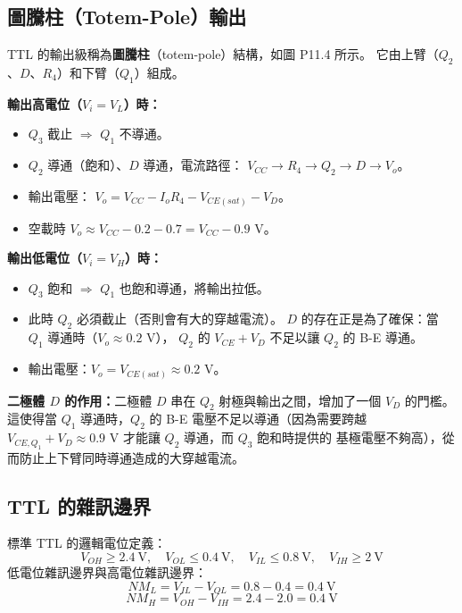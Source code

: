 \documentclass[12pt]{article}
\begin{document}
\subsection*{圖騰柱（Totem-Pole）輸出}

\begin{minipage}{0.58\linewidth}
TTL 的輸出級稱為\textbf{圖騰柱}（totem-pole）結構，如圖 P11.4 所示。
它由上臂（$Q_2$、$D$、$R_4$）和下臂（$Q_1$）組成。

\textbf{輸出高電位（$V_i = V_L$）時：}
\begin{itemize}[leftmargin=1.8em,itemsep=1pt]
\item $Q_3$ 截止 $\Rightarrow$ $Q_1$ 不導通。
\item $Q_2$ 導通（飽和）、$D$ 導通，電流路徑：
  $V_{CC} \to R_4 \to Q_2 \to D \to V_o$。
\item 輸出電壓：
  $V_o = V_{CC} - I_o R_4 - V_{CE(sat)} - V_D$。
\item 空載時 $V_o \approx V_{CC} - 0.2 - 0.7 = V_{CC} - 0.9$ V。
\end{itemize}
\end{minipage}\hfill
\begin{minipage}{0.39\linewidth}
\end{minipage}

\medskip
\textbf{輸出低電位（$V_i = V_H$）時：}
\begin{itemize}[leftmargin=1.8em,itemsep=1pt]
\item $Q_3$ 飽和 $\Rightarrow$ $Q_1$ 也飽和導通，將輸出拉低。
\item 此時 $Q_2$ 必須截止（否則會有大的穿越電流）。
  $D$ 的存在正是為了確保：當 $Q_1$ 導通時（$V_o \approx 0.2$ V），
  $Q_2$ 的 $V_{CE} + V_D$ 不足以讓 $Q_2$ 的 B-E 導通。
\item 輸出電壓：$V_o = V_{CE(sat)} \approx 0.2$ V。
\end{itemize}

\textbf{二極體 $D$ 的作用：}二極體 $D$ 串在 $Q_2$ 射極與輸出之間，增加了一個 $V_D$
的門檻。這使得當 $Q_1$ 導通時，$Q_2$ 的 B-E 電壓不足以導通（因為需要跨越
$V_{CE,Q_1} + V_D \approx 0.9$ V 才能讓 $Q_2$ 導通，而 $Q_3$ 飽和時提供的
基極電壓不夠高），從而防止上下臂同時導通造成的大穿越電流。

\subsection*{TTL 的雜訊邊界}

\begin{formulabox}
標準 TTL 的邏輯電位定義：
\[
V_{OH} \ge 2.4\ \text{V},\quad V_{OL} \le 0.4\ \text{V},\quad
V_{IL} \le 0.8\ \text{V},\quad V_{IH} \ge 2\ \text{V}
\]
低電位雜訊邊界與高電位雜訊邊界：
\[
NM_L = V_{IL} - V_{OL} = 0.8 - 0.4 = 0.4\ \text{V}
\]
\[
NM_H = V_{OH} - V_{IH} = 2.4 - 2.0 = 0.4\ \text{V}
\]
\end{formulabox}
\end{document}
